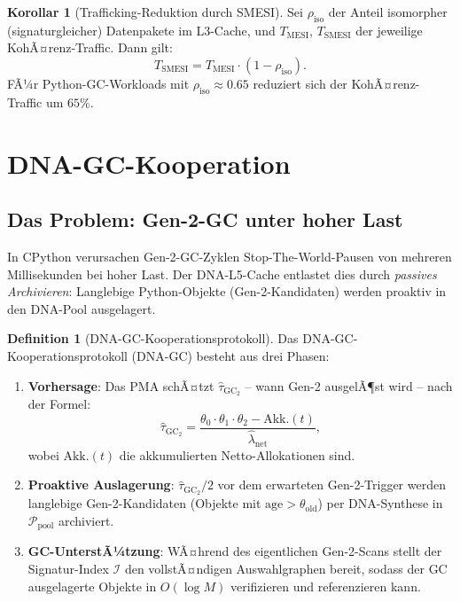 ﻿\documentclass[a4paper,12pt]{article}
\theoremstyle{definition}
\newtheorem{definition}{Definition}[section]
\newtheorem{korollar}{Korollar}[section]
\begin{document}
\begin{korollar}[Trafficking-Reduktion durch SMESI]
  \label{kor:smesi_traffic}
  Sei $\rho_{\mathrm{iso}}$ der Anteil isomorpher (signaturgleicher) Datenpakete
  im L3-Cache, und $T_{\mathrm{MESI}}$, $T_{\mathrm{SMESI}}$ der jeweilige
  KohÃ¤renz-Traffic. Dann gilt:
  \[
    T_{\mathrm{SMESI}} = T_{\mathrm{MESI}} \cdot (1 - \rho_{\mathrm{iso}}).
  \]
  FÃ¼r Python-GC-Workloads mit $\rho_{\mathrm{iso}} \approx 0.65$
  reduziert sich der KohÃ¤renz-Traffic um $65\%$.
\end{korollar}

\section{DNA-GC-Kooperation}

\subsection{Das Problem: Gen-2-GC unter hoher Last}

In CPython verursachen Gen-2-GC-Zyklen Stop-The-World-Pausen von
mehreren Millisekunden bei hoher Last. Der DNA-L5-Cache entlastet
dies durch \emph{passives Archivieren}: Langlebige Python-Objekte
(Gen-2-Kandidaten) werden proaktiv in den DNA-Pool ausgelagert.

\begin{definition}[DNA-GC-Kooperationsprotokoll]
  \label{def:dna_gc}
  Das DNA-GC-Kooperationsprotokoll ($\mathrm{DNA\text{-}GC}$) besteht
  aus drei Phasen:
  \begin{enumerate}[noitemsep]
    \item \textbf{Vorhersage}: Das PMA schÃ¤tzt $\hat\tau_{\mathrm{GC}_2}$
      -- wann Gen-2 ausgelÃ¶st wird -- nach der Formel:
      \[
        \hat\tau_{\mathrm{GC}_2} = \frac{\theta_0 \cdot \theta_1 \cdot \theta_2
        - \text{Akk.}(t)}{\hat\lambda_{\mathrm{net}}},
      \]
      wobei $\text{Akk.}(t)$ die akkumulierten Netto-Allokationen sind.
    \item \textbf{Proaktive Auslagerung}: $\hat\tau_{\mathrm{GC}_2} / 2$
      vor dem erwarteten Gen-2-Trigger werden langlebige Gen-2-Kandidaten
      (Objekte mit $\mathrm{age} > \theta_{\mathrm{old}}$) per
      DNA-Synthese in $\mathcal{P}_{\mathrm{pool}}$ archiviert.
    \item \textbf{GC-UnterstÃ¼tzung}: WÃ¤hrend des eigentlichen Gen-2-Scans
      stellt der Signatur-Index $\mathcal{I}$ den vollstÃ¤ndigen
      Auswahlgraphen bereit, sodass der GC ausgelagerte Objekte in
      $O(\log M)$ verifizieren und referenzieren kann.
  \end{enumerate}
\end{definition}
\end{document}
